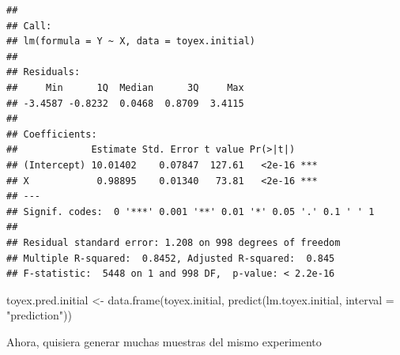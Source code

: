 \documentclass[
  12pt,
]{book}
\newenvironment{Shaded}{\begin{snugshade}}{\end{snugshade}}
\newcommand{\AttributeTok}[1]{\textcolor[rgb]{0.77,0.63,0.00}{#1}}
\newcommand{\FunctionTok}[1]{\textcolor[rgb]{0.00,0.00,0.00}{#1}}
\newcommand{\NormalTok}[1]{#1}
\newcommand{\OtherTok}[1]{\textcolor[rgb]{0.56,0.35,0.01}{#1}}
\newcommand{\StringTok}[1]{\textcolor[rgb]{0.31,0.60,0.02}{#1}}
\theoremstyle{definition}
\theoremstyle{definition}
\theoremstyle{definition}
\theoremstyle{definition}
\theoremstyle{remark}
\begin{document}
\begin{verbatim}
## 
## Call:
## lm(formula = Y ~ X, data = toyex.initial)
## 
## Residuals:
##     Min      1Q  Median      3Q     Max 
## -3.4587 -0.8232  0.0468  0.8709  3.4115 
## 
## Coefficients:
##             Estimate Std. Error t value Pr(>|t|)    
## (Intercept) 10.01402    0.07847  127.61   <2e-16 ***
## X            0.98895    0.01340   73.81   <2e-16 ***
## ---
## Signif. codes:  0 '***' 0.001 '**' 0.01 '*' 0.05 '.' 0.1 ' ' 1
## 
## Residual standard error: 1.208 on 998 degrees of freedom
## Multiple R-squared:  0.8452, Adjusted R-squared:  0.845 
## F-statistic:  5448 on 1 and 998 DF,  p-value: < 2.2e-16
\end{verbatim}

\begin{Shaded}
\begin{Highlighting}[]
\NormalTok{toyex.pred.initial }\OtherTok{\textless{}{-}} \FunctionTok{data.frame}\NormalTok{(toyex.initial, }\FunctionTok{predict}\NormalTok{(lm.toyex.initial,}
    \AttributeTok{interval =} \StringTok{"prediction"}\NormalTok{))}
\end{Highlighting}
\end{Shaded}

Ahora, quisiera generar muchas muestras del mismo experimento
\end{document}
